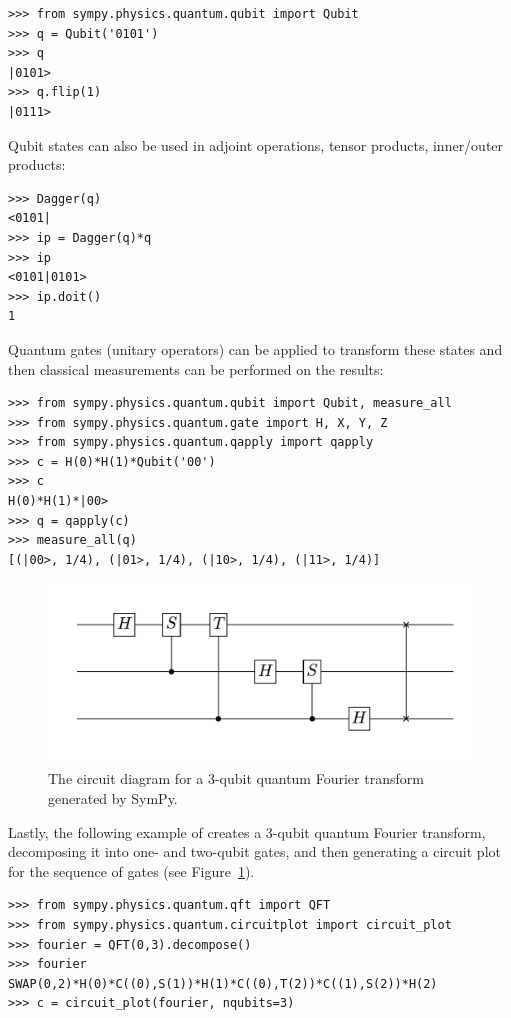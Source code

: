 \begin{verbatim}
>>> from sympy.physics.quantum.qubit import Qubit
>>> q = Qubit('0101')
>>> q
|0101>
>>> q.flip(1)
|0111>
\end{verbatim}
Qubit states can also be used in adjoint operations, tensor products, inner/outer
products:
\begin{verbatim}
>>> Dagger(q)
<0101|
>>> ip = Dagger(q)*q
>>> ip
<0101|0101>
>>> ip.doit()
1
\end{verbatim}
Quantum gates (unitary operators) can be applied to transform these states and
then classical measurements can be performed on the results:
\begin{verbatim}
>>> from sympy.physics.quantum.qubit import Qubit, measure_all
>>> from sympy.physics.quantum.gate import H, X, Y, Z
>>> from sympy.physics.quantum.qapply import qapply
>>> c = H(0)*H(1)*Qubit('00')
>>> c
H(0)*H(1)*|00>
>>> q = qapply(c)
>>> measure_all(q)
[(|00>, 1/4), (|01>, 1/4), (|10>, 1/4), (|11>, 1/4)]
\end{verbatim}
\begin{figure}[htbp]
\begin{center}
\includegraphics[scale=0.65]{images/circuitplot-qft}
\caption{The circuit diagram for a 3-qubit quantum Fourier transform
generated by SymPy.}
\label{fig-circuitplot-qft}
\end{center}
\end{figure}
Lastly, the following example of creates a 3-qubit quantum Fourier transform,
decomposing it into one- and two-qubit gates, and then generating a circuit plot
for the sequence of gates (see Figure~\ref{fig-circuitplot-qft}).
\begin{verbatim}
>>> from sympy.physics.quantum.qft import QFT
>>> from sympy.physics.quantum.circuitplot import circuit_plot
>>> fourier = QFT(0,3).decompose()
>>> fourier
SWAP(0,2)*H(0)*C((0),S(1))*H(1)*C((0),T(2))*C((1),S(2))*H(2)
>>> c = circuit_plot(fourier, nqubits=3)
\end{verbatim}
